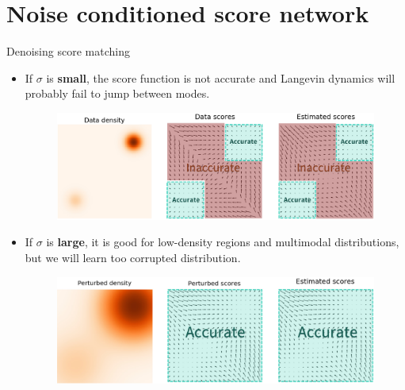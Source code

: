 \section{Noise conditioned score network}
\begin{frame}{Denoising score matching}
	\begin{itemize}
		\item If $\sigma$ is \textbf{small}, the score function is not accurate and Langevin dynamics will probably fail to jump between modes.
		\begin{figure}
			\includegraphics[width=0.75\linewidth]{figs/pitfalls}
		\end{figure}
		\item If $\sigma$ is \textbf{large}, it is good for low-density regions and  multimodal distributions, but we will learn too corrupted distribution.
		\begin{figure}
			\includegraphics[width=0.75\linewidth]{figs/single_noise}
		\end{figure}
	\end{itemize}
\end{frame}

